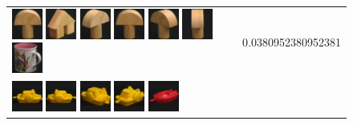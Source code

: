 {\begin{figure}[p]
\begin{tabular}{m{11cm} | m{3cm} |}
\includegraphics[width=1cm]{coil/beeld-0.eps}
\includegraphics[width=1cm]{coil/beeld-45.eps}
\includegraphics[width=1cm]{coil/beeld-3.eps}
\includegraphics[width=1cm]{coil/beeld-1.eps}
\includegraphics[width=1cm]{coil/beeld-4.eps}
\includegraphics[width=1cm]{coil/beeld-2.eps}
\includegraphics[width=1cm]{coil/beeld-10.eps}
& {\scriptsize 0.0380952380952381}
\\
\includegraphics[width=1cm]{coil/beeld-12.eps}
\includegraphics[width=1cm]{coil/beeld-13.eps}
\includegraphics[width=1cm]{coil/beeld-16.eps}
\includegraphics[width=1cm]{coil/beeld-15.eps}
\includegraphics[width=1cm]{coil/beeld-21.eps}

\end{tabular}
\end{figure}}

